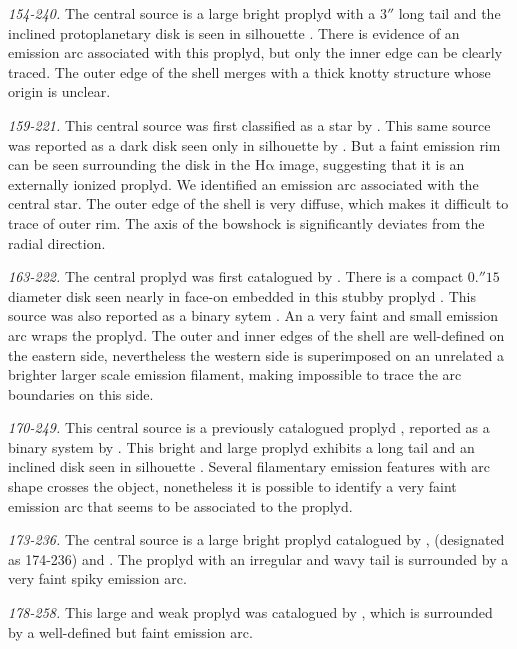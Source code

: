 \documentclass[iop, apj]{emulateapj}
\newcommand\ha{\ensuremath{\mathrm{H\alpha}}}
\begin{document}
\textit{154-240.} The central source is a large bright proplyd \cite{Bally:2000a, Ricci:2008a} with a \(3''\) long tail and the inclined protoplanetary disk is seen in silhouette \citep{Bally:2000a}. There is evidence of an emission arc associated with this proplyd, but only the inner edge can be clearly traced. The outer edge of the shell merges with a thick knotty structure whose origin is unclear.

\textit{159-221.} This central source was first classified as a star by \citet{ODell:1996a}. This same source was reported as a dark disk seen only in silhouette by \citet{Ricci:2008a}. But a faint emission rim can be seen surrounding the disk in the \ha{} image, suggesting that it is an externally ionized proplyd. We identified an emission arc associated with the central star. The outer edge of the shell is very diffuse, which  makes it difficult to trace of outer rim. The axis of the bowshock is significantly deviates from the radial direction.

\textit{163-222.} The central proplyd was first catalogued by \citet{ODell:1996a}. There is a compact \(0.''15\) diameter disk seen nearly in face-on embedded in this stubby proplyd \citep{Bally:2000a, Ricci:2008a}.  This source was also reported as a binary sytem \citep{Ricci:2008a}. An a very faint and small emission arc wraps the proplyd. The outer and inner edges of the shell are well-defined on the eastern side, nevertheless the western side is superimposed on an unrelated a brighter larger scale emission filament, making impossible to trace the arc boundaries on this side.

\textit{170-249.} This central source is a previously catalogued proplyd \citep{ODell:1996a}, reported as a binary system by \citet{Ricci:2008a}. This bright and large proplyd exhibits a long tail and an inclined disk seen in silhouette \citep{Bally:2000a}. Several filamentary emission features with arc shape crosses the object, nonetheless it is possible to identify a very faint emission arc that seems to be associated to the proplyd.

\textit{173-236.} The central source is a large bright proplyd catalogued by \citet{ODell:1996a}, \citet{Bally:2000a} (designated as 174-236) and \citet{Ricci:2008a}. The proplyd with an irregular and wavy tail \citep[see][]{Bally:2000a} is surrounded by a very faint spiky emission arc. 

\textit{178-258.}  This large and weak proplyd was catalogued by \citet{Ricci:2008a}, which is surrounded by a well-defined but faint emission arc.
\end{document}
